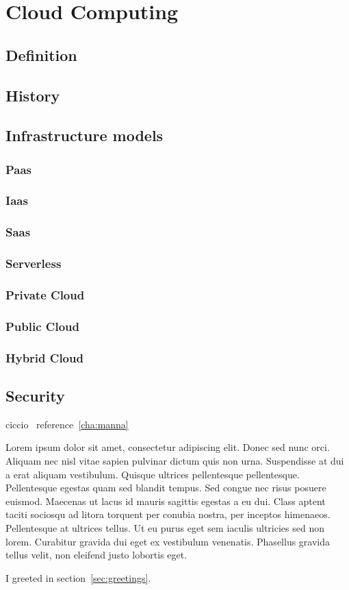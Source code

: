 \chapter{Cloud Computing}
\section{Definition}
\section{History}
\section{Infrastructure models}
\subsection{Paas}
\subsection{Iaas}
\subsection{Saas}
\subsection{Serverless}
\subsection{Private Cloud}
\subsection{Public Cloud}
\subsection{Hybrid Cloud}
\section{Security}

ciccio~\label{cha:manna}
reference~\ref{cha:manna}

Lorem ipsum dolor sit amet, consectetur adipiscing elit. Donec sed nunc orci. Aliquam nec nisl vitae sapien pulvinar dictum quis non urna. Suspendisse at dui a erat aliquam vestibulum. Quisque ultrices pellentesque pellentesque. Pellentesque egestas quam sed blandit tempus. Sed congue nec risus posuere euismod. Maecenas ut lacus id mauris sagittis egestas a eu dui. Class aptent taciti sociosqu ad litora torquent per conubia nostra, per inceptos himenaeos. Pellentesque at ultrices tellus. Ut eu purus eget sem iaculis ultricies sed non lorem. Curabitur gravida dui eget ex vestibulum venenatis. Phasellus gravida tellus velit, non eleifend justo lobortis eget. 


I greeted in section~\ref{sec:greetings}.
